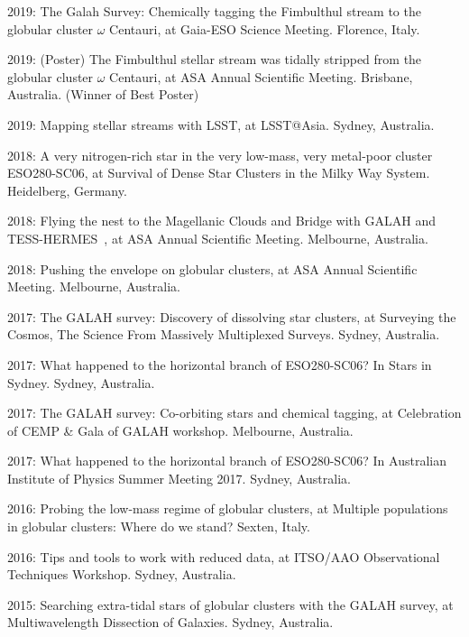 \item[{\color{numcolor}\scriptsize17}] 2019: The Galah Survey: Chemically tagging the Fimbulthul stream to the globular cluster $\omega$ Centauri, at Gaia-ESO Science Meeting. Florence, Italy.
\item[{\color{numcolor}\scriptsize16}] 2019: (Poster) The Fimbulthul stellar stream was tidally stripped from the globular cluster $\omega$ Centauri, at ASA Annual Scientific Meeting. Brisbane, Australia. (Winner of Best Poster)
\item[{\color{numcolor}\scriptsize15}] 2019: Mapping stellar streams with LSST, at LSST@Asia. Sydney, Australia.
\item[{\color{numcolor}\scriptsize14}] 2018: A very nitrogen-rich star in the very low-mass, very metal-poor cluster ESO280-SC06, at Survival of Dense Star Clusters in the Milky Way System. Heidelberg, Germany.
\item[{\color{numcolor}\scriptsize13}] 2018: Flying the nest to the Magellanic Clouds and Bridge with GALAH and TESS-HERMES~, at ASA Annual Scientific Meeting. Melbourne, Australia.
\item[{\color{numcolor}\scriptsize12}] 2018: Pushing the envelope on globular clusters, at  ASA Annual Scientific Meeting. Melbourne, Australia.
\item[{\color{numcolor}\scriptsize11}] 2017: The GALAH survey: Discovery of dissolving star clusters, at  Surveying the Cosmos, The Science From Massively Multiplexed Surveys. Sydney, Australia.
\item[{\color{numcolor}\scriptsize10}] 2017: What happened to the horizontal branch of ESO280-SC06? In Stars in Sydney. Sydney, Australia.
\item[{\color{numcolor}\scriptsize9}] 2017: The GALAH survey: Co-orbiting stars and chemical tagging, at  Celebration of CEMP \& Gala of GALAH workshop. Melbourne, Australia.
\item[{\color{numcolor}\scriptsize8}] 2017: What happened to the horizontal branch of ESO280-SC06? In Australian Institute of Physics Summer Meeting 2017. Sydney, Australia.
\item[{\color{numcolor}\scriptsize7}] 2016: Probing the low-mass regime of globular clusters, at  Multiple populations in globular clusters: Where do we stand? Sexten, Italy.
\item[{\color{numcolor}\scriptsize6}] 2016: Tips and tools to work with reduced data, at  ITSO/AAO Observational Techniques Workshop. Sydney, Australia.
\item[{\color{numcolor}\scriptsize5}] 2015: Searching extra-tidal stars of globular clusters with the GALAH survey, at  Multiwavelength Dissection of Galaxies. Sydney, Australia.
